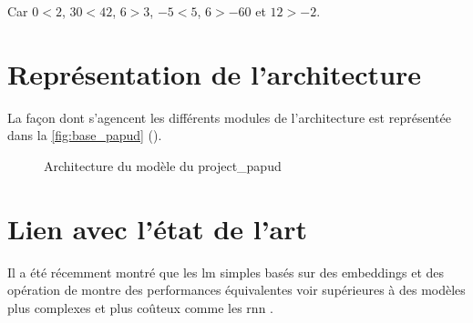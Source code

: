 Car $0<2$, $30<42$, $6>3$, $-5<5$, $6>-60$ et $12>-2$.

\section{Représentation de l'architecture}

La façon dont s'agencent les différents modules de l'architecture est représentée dans la \autoref{fig:base_papud} ().

\begin{figure}[ht]
	\centering
	
	\caption[Architecture du modèle du projet PAPUD]{Architecture du modèle du \gls{project_papud}}
	\label{fig:base_papud}
\end{figure}

\section{Lien avec l'état de l'art}
Il a été récemment montré que les \gls{lm} simples basés sur des  \glspl{embedding} et des opération de 
montre des performances équivalentes voir supérieures à des modèles plus complexes et plus coûteux comme les \gls{rnn} \autocite{pooling_simple}.

%
%
%
%
%
